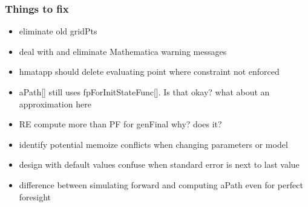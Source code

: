 \documentclass{beamer}
\begin{document}
%
%
%
%  
%  
%
%
%  
%     
%
%
%
%
%  
%     
%
%
%  
%     
%



    

  \begin{frame}
    \frametitle{Things to fix}
    \begin{itemize}
      \item eliminate old gridPts
    \item deal with and eliminate Mathematica warning messages
      \item hmatapp should delete evaluating point where constraint not enforced
    \item aPath[] still uses fpForInitStateFunc[].  Is that okay? what about an approximation here
    \item  RE compute more than PF for genFinal why? does it?
    \item identify potential memoize conflicts when changing parameters or model
\item design with default values confuse when standard error is next to last value
\item difference between simulating forward and computing aPath even for perfect foresight

    \end{itemize}
  \end{frame}
\end{document}
